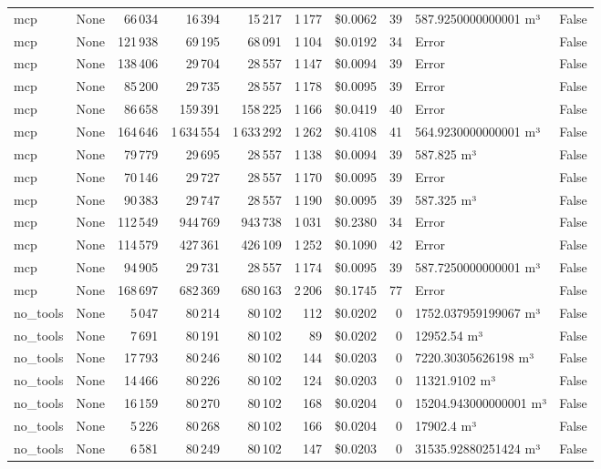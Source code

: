 \documentclass[a4paper,11pt]{article}
\begin{document}
\begin{table}[H]
{\begin{tabular}{l r r r r r r r l r}
mcp & None & 66\,034 & 16\,394 & 15\,217 & 1\,177 & \$0.0062 & 39 & 587.9250000000001 m³ & False \\
mcp & None & 121\,938 & 69\,195 & 68\,091 & 1\,104 & \$0.0192 & 34 & Error & False \\
mcp & None & 138\,406 & 29\,704 & 28\,557 & 1\,147 & \$0.0094 & 39 & Error & False \\
mcp & None & 85\,200 & 29\,735 & 28\,557 & 1\,178 & \$0.0095 & 39 & Error & False \\
mcp & None & 86\,658 & 159\,391 & 158\,225 & 1\,166 & \$0.0419 & 40 & Error & False \\
mcp & None & 164\,646 & 1\,634\,554 & 1\,633\,292 & 1\,262 & \$0.4108 & 41 & 564.9230000000001 m³ & False \\
mcp & None & 79\,779 & 29\,695 & 28\,557 & 1\,138 & \$0.0094 & 39 & 587.825 m³ & False \\
mcp & None & 70\,146 & 29\,727 & 28\,557 & 1\,170 & \$0.0095 & 39 & Error & False \\
mcp & None & 90\,383 & 29\,747 & 28\,557 & 1\,190 & \$0.0095 & 39 & 587.325 m³ & False \\
mcp & None & 112\,549 & 944\,769 & 943\,738 & 1\,031 & \$0.2380 & 34 & Error & False \\
mcp & None & 114\,579 & 427\,361 & 426\,109 & 1\,252 & \$0.1090 & 42 & Error & False \\
mcp & None & 94\,905 & 29\,731 & 28\,557 & 1\,174 & \$0.0095 & 39 & 587.7250000000001 m³ & False \\
mcp & None & 168\,697 & 682\,369 & 680\,163 & 2\,206 & \$0.1745 & 77 & Error & False \\
\midrule
no\_tools & None & 5\,047 & 80\,214 & 80\,102 & 112 & \$0.0202 & 0 & 1752.037959199067 m³ & False \\
no\_tools & None & 7\,691 & 80\,191 & 80\,102 & 89 & \$0.0202 & 0 & 12952.54 m³ & False \\
no\_tools & None & 17\,793 & 80\,246 & 80\,102 & 144 & \$0.0203 & 0 & 7220.30305626198 m³ & False \\
no\_tools & None & 14\,466 & 80\,226 & 80\,102 & 124 & \$0.0203 & 0 & 11321.9102 m³ & False \\
no\_tools & None & 16\,159 & 80\,270 & 80\,102 & 168 & \$0.0204 & 0 & 15204.943000000001 m³ & False \\
no\_tools & None & 5\,226 & 80\,268 & 80\,102 & 166 & \$0.0204 & 0 & 17902.4 m³ & False \\
no\_tools & None & 6\,581 & 80\,249 & 80\,102 & 147 & \$0.0203 & 0 & 31535.92880251424 m³ & False \\

\end{tabular}}
\end{table}
\end{document}
